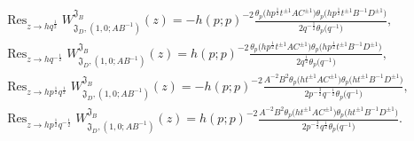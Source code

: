 \documentclass[a4paper,12pt]{article}
\begin{document}
\begin{gather*}
\operatorname{Res}_{z\to h q^\frac12} W^{{\mathfrak J}_B}_{{\mathfrak J}_D, (1,0; AB^{-1})}(z)=
-h(p;p)^{-2}\frac{\theta_p\big(h p^\frac{1}{2}t^{\pm1}A C^{\pm1}\big)\theta_p\big(h p^\frac{1}{2}t^{\pm1}B^{-1}D^{\pm1}\big)}
{2q^{-\frac12}\theta_p\big(q^{-1}\big)},\\
\operatorname{Res}_{z\to h q^{-\frac12}} W^{{\mathfrak J}_B}_{{\mathfrak J}_D, (1,0; AB^{-1})}(z)=
h(p;p)^{-2}\frac{\theta_p\big(hp^\frac{1}{2}t^{\pm1}A C^{\pm1}\big)\theta_p\big(h p^\frac{1}{2}t^{\pm1}B^{-1}D^{\pm1}\big)}
{2q^{\frac12}\theta_p\big(q^{-1}\big)},\\
\operatorname{Res}_{z\to h p^\frac12 q^{\frac12}} W^{{\mathfrak J}_B}_{{\mathfrak J}_D, (1,0; AB^{-1})}(z)=
-h (p;p)^{-2}\frac{A^{-2}B^{2}\theta_p\big(h t^{\pm1}A C^{\pm1}\big)\theta_p\big(h t^{\pm1}B^{-1}D^{\pm1}\big)}
{2p^{-\frac32}q^{-\frac12}\theta_p\big(q^{-1}\big)},\\
\operatorname{Res}_{z\to h p^\frac12 q^{-\frac12}} W^{{\mathfrak J}_B}_{{\mathfrak J}_D, (1,0; AB^{-1})}(z)=
h (p;p)^{-2}\frac{A^{-2}B^{2}\theta_p\big(h t^{\pm1}A C^{\pm1}\big)\theta_p\big(h t^{\pm1}B^{-1}D^{\pm1}\big)}
{2p^{-\frac32}q^{\frac12}\theta_p\big(q^{-1}\big)}.
\end{gather*}
\end{document}
